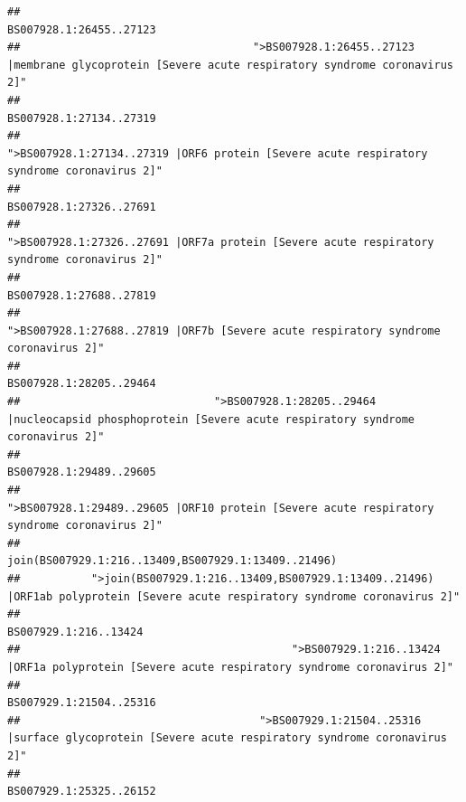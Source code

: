 \documentclass[
]{article}
\begin{document}
\begin{verbatim}
##                                                                                                                BS007928.1:26455..27123 
##                                    ">BS007928.1:26455..27123 |membrane glycoprotein [Severe acute respiratory syndrome coronavirus 2]" 
##                                                                                                                BS007928.1:27134..27319 
##                                             ">BS007928.1:27134..27319 |ORF6 protein [Severe acute respiratory syndrome coronavirus 2]" 
##                                                                                                                BS007928.1:27326..27691 
##                                            ">BS007928.1:27326..27691 |ORF7a protein [Severe acute respiratory syndrome coronavirus 2]" 
##                                                                                                                BS007928.1:27688..27819 
##                                                    ">BS007928.1:27688..27819 |ORF7b [Severe acute respiratory syndrome coronavirus 2]" 
##                                                                                                                BS007928.1:28205..29464 
##                              ">BS007928.1:28205..29464 |nucleocapsid phosphoprotein [Severe acute respiratory syndrome coronavirus 2]" 
##                                                                                                                BS007928.1:29489..29605 
##                                            ">BS007928.1:29489..29605 |ORF10 protein [Severe acute respiratory syndrome coronavirus 2]" 
##                                                                                    join(BS007929.1:216..13409,BS007929.1:13409..21496) 
##           ">join(BS007929.1:216..13409,BS007929.1:13409..21496) |ORF1ab polyprotein [Severe acute respiratory syndrome coronavirus 2]" 
##                                                                                                                  BS007929.1:216..13424 
##                                          ">BS007929.1:216..13424 |ORF1a polyprotein [Severe acute respiratory syndrome coronavirus 2]" 
##                                                                                                                BS007929.1:21504..25316 
##                                     ">BS007929.1:21504..25316 |surface glycoprotein [Severe acute respiratory syndrome coronavirus 2]" 
##                                                                                                                BS007929.1:25325..26152 

\end{verbatim}
\end{document}
